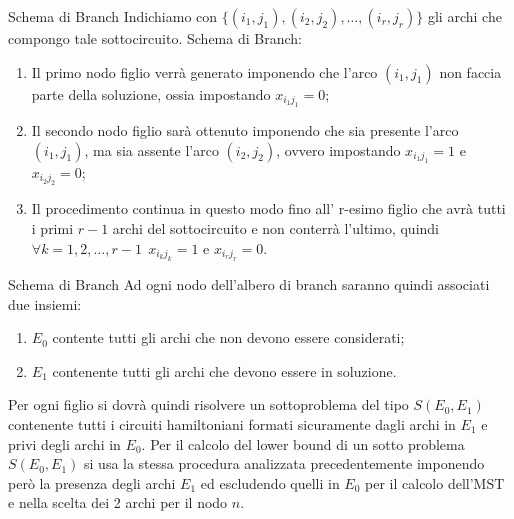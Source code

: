 \documentclass[10pt]{beamer}
\begin{document}
    \begin{frame}{Schema di Branch}
        Indichiamo con $\{(i_1, j_1), (i_2,j_2),\dots,(i_r,j_r)\}$ gli archi che compongo tale sottocircuito.
        \newline
        \newline
        Schema di Branch:
        \begin{enumerate}[<+->]
            \item  Il primo nodo figlio verrà generato imponendo che l'arco $(i_1,j_1)$ non faccia parte della soluzione, ossia impostando $x_{i_{1}j_{1}} = 0$;
            \item Il secondo nodo figlio sarà ottenuto imponendo che sia presente l'arco $(i_1,j_1)$, ma sia assente l'arco $(i_2,j_2)$, ovvero impostando $x_{i_{1}j_{1}} = 1$ e $x_{i_{2}j_{2}} = 0$;
            \item Il procedimento continua in questo modo fino all' r-esimo figlio che avrà tutti i primi $r-1$ archi del sottocircuito e non conterrà l'ultimo, quindi $\forall k = 1,2,\dots,r-1 \:\:x_{i_{k}j_{k}} = 1$ e $x_{i_{r}j_{r}} = 0$.
        \end{enumerate}

    \end{frame}

    \begin{frame}{Schema di Branch}
        Ad ogni nodo dell'albero di branch saranno quindi associati due insiemi:
        \begin{enumerate}
            \item $E_0$ contente tutti gli archi che non devono essere considerati;
            \item $E_1$ contenente tutti gli archi che devono essere in soluzione.
        \end{enumerate}
        Per ogni figlio si dovrà quindi risolvere un sottoproblema del tipo $S(E_0, E_1)$ contenente tutti i circuiti hamiltoniani formati sicuramente dagli archi in $E_1$ e privi degli archi in $E_0$.
        \newline
        \newline
        Per il calcolo del lower bound di un sotto problema $S(E_0, E_1)$ si usa la stessa procedura analizzata precedentemente imponendo però la presenza degli archi $E_1$ ed escludendo quelli in $E_0$ per il calcolo dell'MST e nella scelta dei 2 archi per il nodo $n$.
    \end{frame}
\end{document}
